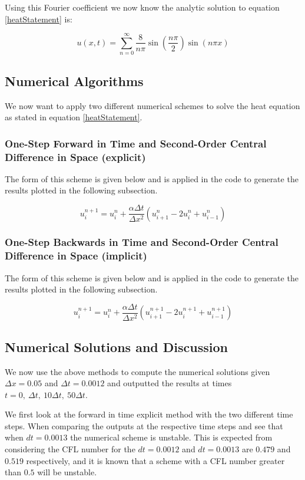 \documentclass[a4paper,12pt,titlepage]{article}
\begin{document}
Using this Fourier coefficient we now know the analytic solution to equation \ref{heatStatement} is:

\begin{equation}
\boxed{u(x,t) = \sum_{n=0}^{\infty} \frac{8}{n \pi} \sin(\frac{n \pi}{2})\sin(n \pi x) }
\end{equation}

\subsection{Numerical Algorithms}
We now want to apply two different numerical schemes to solve the heat equation as stated in equation \ref{heatStatement}.  

\subsubsection{One-Step Forward in Time and Second-Order Central Difference in Space (explicit)}
The form of this scheme is given below and is applied in the code to generate the results plotted in the following subsection.

\begin{equation}
u_{i}^{n+1} = u_{i}^{n} + \frac{\alpha \Delta t}{\Delta x^2}\left(u_{i+1}^n -2 u_{i}^{n} + u_{i-1}^n\right)
\end{equation}

\subsubsection{One-Step Backwards in Time and Second-Order Central Difference in Space (implicit)}
The form of this scheme is given below and is applied in the code to generate the results plotted in the following subsection.

\begin{equation}
u_{i}^{n+1} = u_{i}^{n} + \frac{\alpha \Delta t}{\Delta x^2}\left(u_{i+1}^{n+1} -2 u_{i}^{n+1} + u_{i-1}^{n+1}\right)
\end{equation}


\subsection{Numerical Solutions and Discussion}
We now use the above methods to compute the numerical solutions given $\Delta x = 0.05$ and $\Delta t = 0.0012$ and outputted the results at times $t = 0,\ \Delta t,\ 10 \Delta t,\ 50 \Delta t$.

We first look at the forward in time explicit method with the two different time steps.  When comparing the outputs at the respective time steps and see that when $dt = 0.0013$ the numerical scheme is unstable.  This is expected from considering the CFL number for the $dt = 0.0012$ and $dt = 0.0013$ are $0.479$ and $0.519$ respectively, and it is known that a scheme with a CFL number greater than $0.5$ will be unstable.
\end{document}
